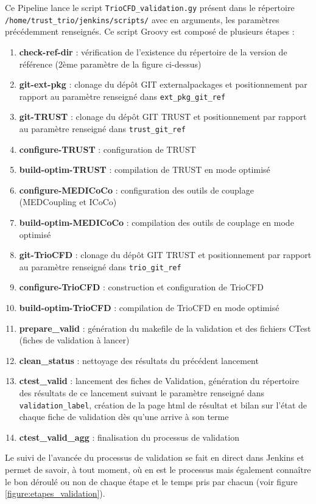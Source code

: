 Ce Pipeline lance le script \texttt{TrioCFD\_validation.gy} présent dans le répertoire \texttt{/home/trust\_trio/jenkins/scripts/} avec en arguments, les paramètres précédemment renseignés. Ce script Groovy est composé de plusieurs étapes :
\begin{enumerate}
\item \textbf{check-ref-dir} : vérification de l'existence du répertoire de la version de référence (2ème paramètre de la figure ci-dessus)
\item \textbf{git-ext-pkg} : clonage du dépôt GIT externalpackages et positionnement par rapport au paramètre renseigné dans \texttt{ext\_pkg\_git\_ref}
\item \textbf{git-TRUST} : clonage du dépôt GIT TRUST et positionnement par rapport au paramètre renseigné dans \texttt{trust\_git\_ref}
\item \textbf{configure-TRUST} : configuration de TRUST
\item \textbf{build-optim-TRUST} : compilation de TRUST en mode optimisé
\item \textbf{configure-MEDICoCo} : configuration des outils de couplage (MEDCoupling et ICoCo)
\item \textbf{build-optim-MEDICoCo} : compilation des outils de couplage en mode optimisé
\item \textbf{git-TrioCFD} : clonage du dépôt GIT TRUST et positionnement par rapport au paramètre renseigné dans \texttt{trio\_git\_ref}
\item \textbf{configure-TrioCFD} : construction et configuration de TrioCFD
\item \textbf{build-optim-TrioCFD} : compilation de TrioCFD en mode optimisé
\item \textbf{prepare\_valid} : génération du makefile de la validation et des fichiers CTest (fiches de validation à lancer)
\item \textbf{clean\_status} : nettoyage des résultats du précédent lancement
\item \textbf{ctest\_valid} : lancement des fiches de Validation, génération du répertoire des résultats de ce lancement suivant le paramètre renseigné dans \texttt{validation\_label}, création de la page html de résultat et bilan sur l'état de chaque fiche de validation dès qu'une arrive à son terme
\item \textbf{ctest\_valid\_agg} : finalisation du processus de validation
\end{enumerate}

Le suivi de l'avancée du processus de validation se fait en direct dans Jenkins et permet de savoir, à tout moment, où en est le processus mais également connaître le bon déroulé ou non de chaque étape et le temps pris par chacun (voir figure \ref{figure:etapes_validation}).

